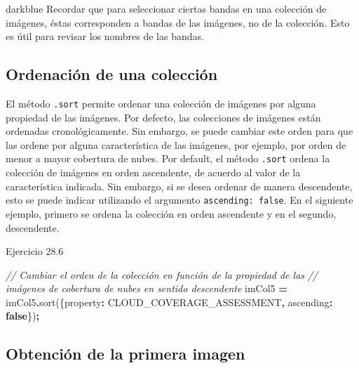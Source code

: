 \documentclass[
  12pt,
  letterpaper,
  twoside]{book}
\newenvironment{Shaded}{\begin{snugshade}}{\end{snugshade}}
\newcommand{\CommentTok}[1]{\textcolor[rgb]{0.56,0.35,0.01}{\textit{#1}}}
\newcommand{\DataTypeTok}[1]{\textcolor[rgb]{0.13,0.29,0.53}{#1}}
\newcommand{\FunctionTok}[1]{\textcolor[rgb]{0.00,0.00,0.00}{#1}}
\newcommand{\KeywordTok}[1]{\textcolor[rgb]{0.13,0.29,0.53}{\textbf{#1}}}
\newcommand{\NormalTok}[1]{#1}
\newcommand{\OperatorTok}[1]{\textcolor[rgb]{0.81,0.36,0.00}{\textbf{#1}}}
\newcommand{\StringTok}[1]{\textcolor[rgb]{0.31,0.60,0.02}{#1}}
\begin{document}
\begin{bluebox2}

\begin{awesomeblock}{5pt}{\faLightbulb}{darkblue}
Recordar que para seleccionar ciertas bandas en una colección de imágenes, éstas corresponden a bandas de las imágenes, no de la colección. Esto es útil para revisar los nombres de las bandas.

\end{awesomeblock}

\end{bluebox2}

\hypertarget{ordenaciuxf3n-de-una-colecciuxf3n}{%
\subsection{Ordenación de una colección}\label{ordenaciuxf3n-de-una-colecciuxf3n}}

El método \texttt{.sort} permite ordenar una colección de imágenes por alguna propiedad de las imágenes. Por defecto, las colecciones de imágenes están ordenadas cronológicamente. Sin embargo, se puede cambiar este orden para que las ordene por alguna característica de las imágenes, por ejemplo, por orden de menor a mayor cobertura de nubes. Por default, el método \texttt{.sort} ordena la colección de imágenes en orden ascendente, de acuerdo al valor de la característica indicada. Sin embargo, si se desea ordenar de manera descendente, esto se puede indicar utilizando el argumento \texttt{ascending:\ false}. En el siguiente ejemplo, primero se ordena la colección en orden ascendente y en el segundo, descendente.

Ejercicio 28.6

\begin{Shaded}
\begin{Highlighting}[]
\CommentTok{// Cambiar el orden de la colección en función de la propiedad de las }
\CommentTok{// imágenes de cobertura de nubes en sentido descendente}
\NormalTok{imCol5 }\OperatorTok{=}\NormalTok{ imCol5}\OperatorTok{.}\FunctionTok{sort}\NormalTok{(\{}\DataTypeTok{property}\OperatorTok{:} \StringTok{\textquotesingle{}CLOUD\_COVERAGE\_ASSESSMENT\textquotesingle{}}\OperatorTok{,} 
  \DataTypeTok{ascending}\OperatorTok{:} \KeywordTok{false}\NormalTok{\})}\OperatorTok{;}
\end{Highlighting}
\end{Shaded}

\hypertarget{obtenciuxf3n-de-la-primera-imagen}{%
\subsection{Obtención de la primera imagen}\label{obtenciuxf3n-de-la-primera-imagen}}
\end{document}

